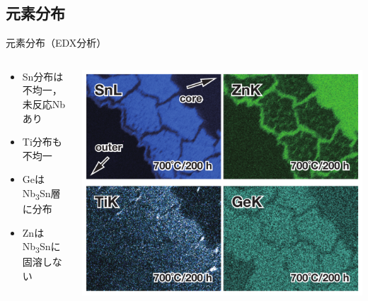 \documentclass[aspectratio=169, unicode, 10pt]{beamer}
\begin{document}
	\subsection{元素分布}
	\begin{frame}{元素分布（EDX分析）}
		\begin{columns}
			\begin{column}{0.5\linewidth}
				\begin{itemize}
					\item Sn分布は不均一，未反応Nbあり
					\item Ti分布も不均一
					\item GeはNb\textsubscript{3}Sn層に分布
					\item ZnはNb\textsubscript{3}Snに固溶しない
				\end{itemize}
			\end{column}
			\begin{column}{0.5\linewidth}
				\centering
				\includegraphics[width=\linewidth]{figs/14Zn1Ge-EDX.pdf}
			\end{column}
		\end{columns}
	\end{frame}
\end{document}
